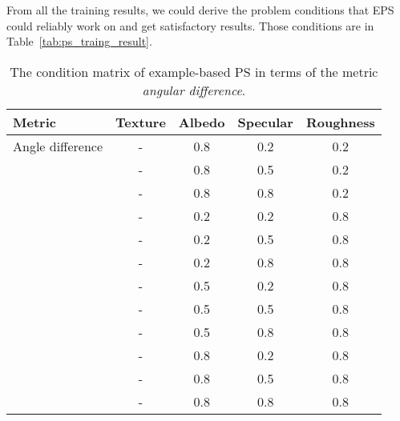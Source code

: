 From all the training results, we could derive the problem conditions that EPS could reliably work on and get satisfactory results. Those conditions are in Table~\ref{tab:ps_traing_result}.
\begin{table}[!htbp]
  \centering
  \begin{tabular}{l*{4}{c}}
  \hline
  \textbf{Metric} & Texture & Albedo & Specular & Roughness\\
  \hline
  Angle difference & - & 0.8 & 0.2 & 0.2\\
                   & - & 0.8 & 0.5 & 0.2\\
                   & - & 0.8 & 0.8 & 0.2\\
                   & - & 0.2 & 0.2 & 0.8\\
                   & - & 0.2 & 0.5 & 0.8\\
                   & - & 0.2 & 0.8 & 0.8\\
                   & - & 0.5 & 0.2 & 0.8\\
                   & - & 0.5 & 0.5 & 0.8\\
                   & - & 0.5 & 0.8 & 0.8\\
                   & - & 0.8 & 0.2 & 0.8\\
                   & - & 0.8 & 0.5 & 0.8\\
                   & - & 0.8 & 0.8 & 0.8\\
  \hline
  \end{tabular}
  \caption{The condition matrix of example-based PS in terms of the metric \textit{angular difference}.}
  \label{tab:ps_training_result}
\end{table}

